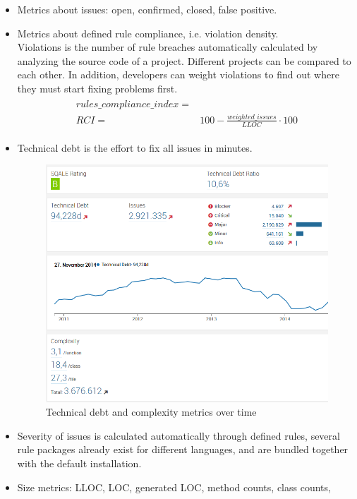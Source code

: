 \begin{itemize}
	\item Metrics about issues: open, confirmed, closed, false positive.
	\item Metrics about defined rule compliance, i.e. violation density. \\
	Violations is the number of rule breaches automatically calculated by
	analyzing the source code of a project. Different projects can be compared to each other. In addition, developers can weight violations to find out where they must start fixing problems first.
	\begin{align}
		\begin{split}
			\label{eq:rules_compliance_index}
			rules\_compliance\_index =&\\
			RCI =& 100 - \frac{weighted\_issues}{LLOC} \cdot 100
		\end{split}
	\end{align}
	\item Technical debt is the effort to fix all issues in minutes.
	\begin{figure}[h]
		\centering
		\includegraphics[scale=0.4]{img/technical_debt.jpg}
		\caption{Technical debt and complexity metrics over time} 
		\label{fig:technical_debt}
	\end{figure}
	\item Severity of issues is calculated automatically through defined rules,
	several rule packages already exist for different languages, and are bundled
	together with the default installation.
	\item Size metrics: LLOC, LOC, generated LOC, method counts, class counts, 

\end{itemize}
